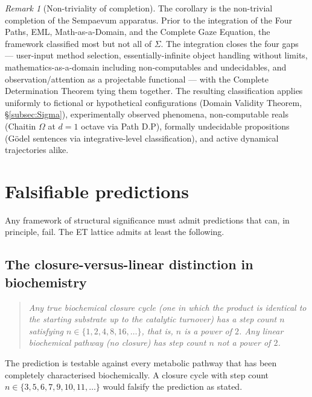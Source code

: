 \documentclass[11pt,a4paper]{article}
\theoremstyle{definition}
\theoremstyle{remark}
\newtheorem{remark}[theorem]{Remark}
\begin{document}
\begin{remark}[Non-triviality of completion]
The corollary is the non-trivial completion of the Sempaevum apparatus. Prior to the integration of the Four Paths, EML, Math-as-a-Domain, and the Complete Gaze Equation, the framework classified most but not all of $\Sigma$. The integration closes the four gaps --- user-input method selection, essentially-infinite object handling without limits, mathematics-as-a-domain including non-computables and undecidables, and observation/attention as a projectable functional --- with the Complete Determination Theorem tying them together. The resulting classification applies uniformly to fictional or hypothetical configurations (Domain Validity Theorem, \S\ref{subsec:Sigma}), experimentally observed phenomena, non-computable reals (Chaitin $\Omega$ at $d=1$ octave via Path D.P), formally undecidable propositions (G\"odel sentences via integrative-level classification), and active dynamical trajectories alike.
\end{remark}

\section{Falsifiable predictions}\label{sec:predictions}

Any framework of structural significance must admit predictions that can, in principle, fail. The ET lattice admits at least the following.

\subsection{The closure-versus-linear distinction in biochemistry}

\begin{quote}\itshape
Any true biochemical closure cycle (one in which the product is identical to the starting substrate up to the catalytic turnover) has a step count $n$ satisfying $n\in\{1,2,4,8,16,\ldots\}$, that is, $n$ is a power of $2$. Any linear biochemical pathway (no closure) has step count $n$ not a power of $2$.
\end{quote}

The prediction is testable against every metabolic pathway that has been completely characterised biochemically. A closure cycle with step count $n\in\{3,5,6,7,9,10,11,\ldots\}$ would falsify the prediction as stated.
\end{document}

